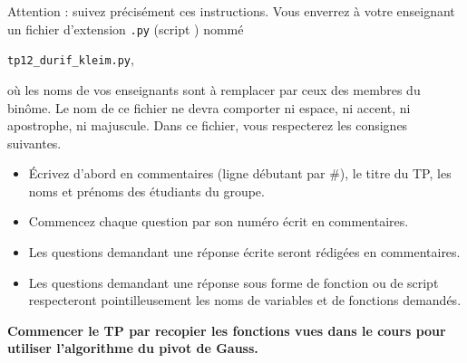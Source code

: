 Attention : suivez précisément ces instructions. Vous enverrez à votre enseignant un fichier d'extension  \texttt{.py} (script \python) nommé
\begin{center}
  \texttt{tp12\_durif\_kleim.py},
\end{center}
où les noms de vos enseignants sont à remplacer par ceux des membres du binôme. Le nom de ce 
fichier ne devra comporter ni espace, ni accent, ni apostrophe, ni majuscule.
Dans ce fichier, vous respecterez les consignes suivantes.
\begin{itemize}
  \item \'Ecrivez d'abord en commentaires (ligne débutant par \#), le titre du TP, les noms et prénoms des étudiants du groupe.
  \item Commencez chaque question par son numéro écrit en commentaires.
  \item Les questions demandant une réponse écrite seront rédigées en commentaires.
  \item Les questions demandant une réponse sous forme de fonction ou de script respecteront pointilleusement les noms de variables et de fonctions demandés.
\end{itemize} 

\textbf{Commencer le TP par recopier les fonctions vues dans le cours pour utiliser l'algorithme du pivot de Gauss.}

